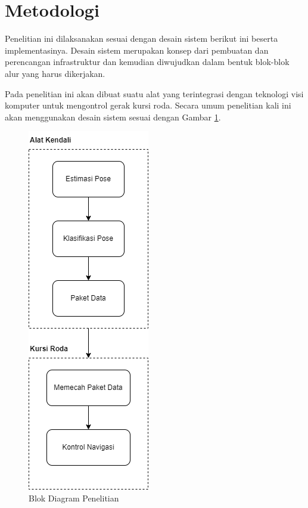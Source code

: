 \section{Metodologi}
\label{sec:metodologi}


Penelitian ini dilaksanakan sesuai dengan desain sistem berikut ini beserta implementasinya. Desain sistem merupakan konsep dari pembuatan dan perencangan infrastruktur dan kemudian diwujudkan dalam bentuk blok-blok alur yang harus dikerjakan.

Pada penelitian ini akan dibuat suatu alat yang terintegrasi dengan teknologi visi komputer untuk mengontrol gerak kursi roda. Secara umum penelitian kali ini akan menggunakan desain sistem sesuai dengan Gambar \ref{fig:Metodologi Penelitian}.

\begin{figure} [ht] \centering
    \includegraphics[scale=0.68]{gambar/blokDiagram.png}
    \caption{Blok Diagram Penelitian}
    \label{fig:Metodologi Penelitian}
\end{figure}

